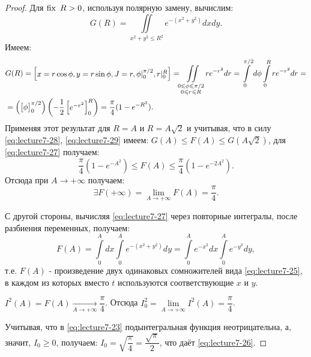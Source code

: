 \begin{proof}
	Для $\operatorname{\text{fix }} R > 0$, используя полярную замену, вычислим:
	\begin{equation}
		\label{eq:lecture7-29}
		G(R) = \iint\limits_{x^2 + y^2 \leqslant R^2}e^{-(x^2 + y^2)}dxdy.
	\end{equation}
	Имеем:
	\begin{equation*}
		\begin{split}
			&G(R) = \left[\begin{matrix}x = r \cos \phi, y = r \sin \phi, J = r,
			  \phi \vert_0^{\pi/2}, r\vert_0^R\end{matrix}\right] =
			\iint\limits_{\substack{0\leqslant\phi\leqslant \pi / 2\\
				0 \leqslant r \leqslant R}}r e^{-r^2}dr =
			\int\limits_0^{\pi/2}d\phi \int\limits_0^Rr e^{-r^2}dr = \\
			&=\left( \left[\begin{matrix}\phi\end{matrix}\right]_0^{\pi/2} \right)
			\left( -\dfrac{1}{2}\left[\begin{matrix}e^{-r^2}\end{matrix}\right]_0^R \right) =
			\dfrac{\pi}{4}(1 - e^{-R^2}).
		\end{split}
	\end{equation*}
    \newpage
	Применяя этот результат для $R = A$ и $R = A \sqrt{2}$ и учитывая, что в силу
	\eqref{eq:lecture7-28}, \eqref{eq:lecture7-29} имеем:
	$G(A) \leqslant F(A) \leqslant G(A \sqrt{2})$, для \eqref{eq:lecture7-27}
	получаем:
	\begin{equation*}
		\dfrac{\pi}{4}(1 - e^{-A^2}) \leqslant F(A) \leqslant
		\dfrac{\pi}{4}(1 - e^{-2A^2}).
	\end{equation*}
	Отсюда при $ A \to + \infty $ получаем:
	\begin{equation*}
		\exists F(+\infty) =
		\lim\limits_{A \to +\infty}F(A) = \dfrac{\pi}{4}.
	\end{equation*}

	С другой стороны, вычисляя \eqref{eq:lecture7-27} через повторные интегралы,
	после разбиения переменных, получаем:
	\begin{equation*}
		F(A) = \int\limits_0^Adx\int\limits_0^A e^{-(x^2 + y^2)}dy =
		\int\limits_0^A e^{-x^2}dx \int\limits_0^A e^{-y^2}dy,
	\end{equation*}
	т.е. $F(A)$ - произведение двух одинаковых сомножителей вида
	\eqref{eq:lecture7-25}, в каждом из которых вместо $t$ используются
	соответствующие $x$ и $y$.

	$I^2(A) = F(A) \xrightarrow[A \to +\infty]{} \dfrac{\pi}{4}$. 
    Отсюда	$I_0^2 = \lim\limits_{A \to +\infty}I^2(A) = \dfrac{\pi}{4}$.
    
    Учитывая, что
	в \eqref{eq:lecture7-23} подынтегральная функция неотрицательна, а,
	значит, $I_0 \geqslant 0$, получаем: $I_0 = \sqrt{\dfrac{\pi}{4}} =
	\dfrac{\sqrt{\pi}}{2}$, что даёт \eqref{eq:lecture7-26}.
\end{proof}

